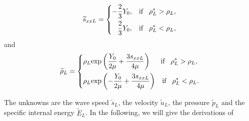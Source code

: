 \documentclass{article}
\theoremstyle{plain}\newtheorem{definition}{\sc{Definition}}
\theoremstyle{defination}\newtheorem{example}{Example}[section]
\numberwithin{equation}{section}
\numberwithin{table}{section}
\begin{document}
\begin{equation}
  \widetilde{s}_{xxL} =\left\{ \begin{aligned}
	  -\frac{2}{3}Y_0, \hspace{0.3cm} \text{if} \hspace{0.3cm} \rho_L^* > \rho_L,\\
	  \frac{2}{3}Y_0, \hspace{0.3cm} \text{if} \hspace{0.3cm} \rho_L^* < \rho_L,\\
	\end{aligned}\right.
  \end{equation}
  and
\begin{equation}   \widetilde{\rho}_{L} = \left\{ \begin{aligned}
	  & \rho_L \text{exp}\left(\frac{Y_0}{2\mu}+\frac{3 s_{xxL}}{4\mu}\right)  \hspace{0.5cm} \text{if} \hspace{0.3cm} \rho_L^* > \rho_L,\\ 
& \rho_L \text{exp}\left(-\frac{Y_0}{2\mu}+\frac{3 s_{xxL}}{4\mu}\right) 
\hspace{0.3cm} \text{if} \hspace{0.3cm} \rho_L^* < \rho_L.\\ 
  \end{aligned}\right.
 \end{equation}

 The unknowns are the wave speed $\widetilde{s}_L$,  the velocity  $\widetilde{u}_L$, the pressure $\widetilde{p}_L$ and the specific internal energy $\widetilde{E}_L$. In the following, we will give the derivations of   
\end{document}
